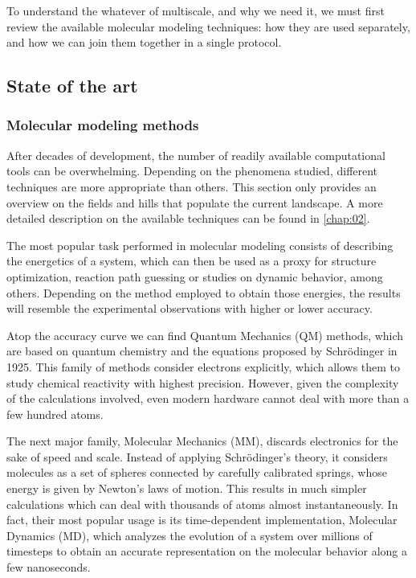 To understand the whatever of multiscale, and why we need it, we must first review the available molecular modeling techniques: how they are used separately, and how we can join them together in a single protocol.

\subsection{State of the art}

\subsubsection{Molecular modeling methods}

After decades of development, the number of readily available computational tools can be overwhelming. Depending on the phenomena studied, different techniques are more appropriate than others. This section only provides an overview on the fields and hills that populate the current landscape. A more detailed description on the available techniques can be found in \autoref{chap:02}.

The most popular task performed in molecular modeling consists of describing the energetics of a system, which can then be used as a proxy for structure optimization, reaction path guessing or studies on dynamic behavior, among others. Depending on the method employed to obtain those energies, the results will resemble the experimental observations with higher or lower accuracy.



Atop the accuracy curve we can find Quantum Mechanics (QM) methods, which are based on quantum chemistry and the equations proposed by Schrödinger in 1925. This family of methods consider electrons explicitly, which allows them to study chemical reactivity with highest precision. However, given the complexity of the calculations involved, even modern hardware cannot deal with more than a few hundred atoms.

The next major family, Molecular Mechanics (MM), discards electronics for the sake of speed and scale. Instead of applying Schrödinger’s theory, it considers molecules as a set of spheres connected by carefully calibrated springs, whose energy is given by Newton’s laws of motion. This results in much simpler calculations which can deal with thousands of atoms almost instantaneously. In fact, their most popular usage is its time-dependent implementation, Molecular Dynamics (MD), which analyzes the evolution of a system over millions of timesteps to obtain an accurate representation on the molecular behavior along a few nanoseconds.

